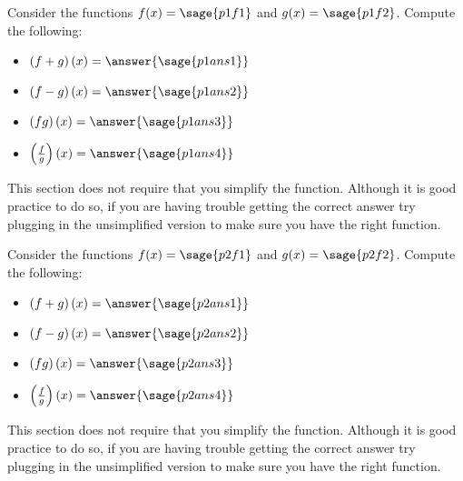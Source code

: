 \documentclass{ximera}
\begin{document}
\begin{problem}
    Consider the functions $f(x) = \sage{p1f1}$ and $g(x) = \sage{p1f2}$. Compute the following:
    \begin{itemize}
        \item $\left(f+g\right)(x) = \answer{\sage{p1ans1}}$
        \item $\left(f-g\right)(x) = \answer{\sage{p1ans2}}$
        \item $\left(fg\right)(x) = \answer{\sage{p1ans3}}$
        \item $\left(\frac{f}{g}\right)(x) = \answer{\sage{p1ans4}}$
    \end{itemize}
    \begin{feedback}
        This section does not require that you simplify the function. Although it is good practice to do so, if you are having trouble getting the correct answer try plugging in the unsimplified version to make sure you have the right function.
    \end{feedback}
\end{problem}


\begin{problem}
    Consider the functions $f(x) = \sage{p2f1}$ and $g(x) = \sage{p2f2}$. Compute the following:
    \begin{itemize}
        \item $\left(f+g\right)(x) = \answer{\sage{p2ans1}}$
        \item $\left(f-g\right)(x) = \answer{\sage{p2ans2}}$
        \item $\left(fg\right)(x) = \answer{\sage{p2ans3}}$
        \item $\left(\frac{f}{g}\right)(x) = \answer{\sage{p2ans4}}$
    \end{itemize}
    \begin{feedback}
        This section does not require that you simplify the function. Although it is good practice to do so, if you are having trouble getting the correct answer try plugging in the unsimplified version to make sure you have the right function.
    \end{feedback}
\end{problem}
\end{document}
